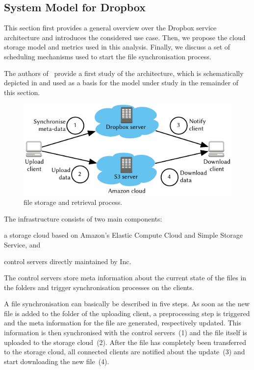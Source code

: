 \subsection{System Model for Dropbox}\label{sec:application:cloud_file_synchronisation:system_model}
This section first provides a general overview over the Dropbox service architecture and introduces the considered use case.
Then, we propose the cloud storage model and metrics used in this analysis.
Finally, we discuss a set of scheduling mechanisms used to start the file synchronisation process. 

The authors of~\cite{Drago2012} provide a first study of the \dropbox architecture, which is schematically depicted in  and used as a basis for the model under study in the remainder of this section.

\begin{figure}
  \centering
  \includegraphics[width=\columnwidth]{application/cloud_file_synchronization/system_model/figures/dropbox_architecture}
  \caption{\dropbox file storage and retrieval process.}
  \label{fig:application:cloud_file_synchronisation:system_model:dropbox_architecture}
\end{figure}

The \dropbox infrastructure consists of two main components:
\begin{enumerate*}
\item a storage cloud based on Amazon's Elastic Compute Cloud and Simple Storage Service, and 
\item control servers directly maintained by \dropbox Inc. 
\end{enumerate*}
The control servers store meta information about the current state of the files in the \dropbox folders and trigger synchronisation processes on the clients.

A file synchronisation can basically be described in five steps.
As soon as the new file is added to the \dropbox folder of the uploading client, a preprocessing step is triggered and the meta information for the file are generated, respectively updated.
This information is then synchronised with the control servers~(1) and the file itself is uploaded to the storage cloud~(2).
After the file has completely been transferred to the storage cloud, all connected clients are notified about the update~(3) and start downloading the new file~(4).

